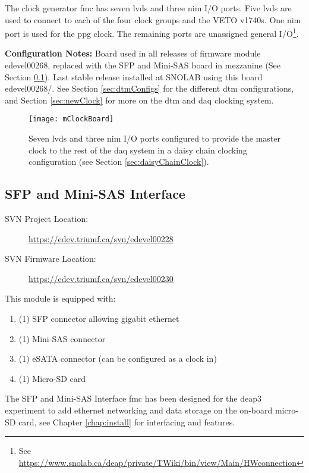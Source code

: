 The clock generator \gls{fmc} has seven \gls{lvds} and three \gls{nim} I/O ports. Five \gls{lvds} are used to connect to each of the four clock groups and the VETO \gls{v1740}s. One \gls{nim} port is used for the \gls{ppg} clock. The remaining ports are unassigned general I/O\footnote{See \url{https://www.snolab.ca/deap/private/TWiki/bin/view/Main/HWconnection}}.

\textbf{Configuration Notes:} Board used in all releases of firmware module edevel00268, replaced with the SFP and Mini-SAS board in mezzanine (See Section \ref{sec:SFPBoard}). Last stable release installed at SNOLAB using this board edevel00268/\tagTwoSixEight. See Section \ref{sec:dtmConfigs} for the different \gls{dtm} configurations, and Section \ref{sec:newClock} for more on the \gls{dtm} and \gls{daq} clocking system.

\begin{figure}
\centering
\texttt{[image: mClockBoard]}
\caption{Seven \gls{lvds} and three \gls{nim} I/O ports configured to provide the master clock to the rest of the \gls{daq} system in a daisy chain clocking configuration (see Section \ref{sec:daisyChainClock}).}
\label{Fig:mClockBoard}
\end{figure}



\subsection{SFP and Mini-SAS Interface}
\label{sec:SFPBoard}
\begin{description}
\item[SVN Project Location: ]\url{https://edev.triumf.ca/svn/edevel00228}
\item[SVN Firmware Location: ]\url{https://edev.triumf.ca/svn/edevel00230}
\end{description}
\noindent This module is equipped with:
	\begin{enumerate}
	\item (1) SFP connector allowing gigabit ethernet
	\item (1) Mini-SAS connector
	\item (1) eSATA connector (can be configured as a clock in)
	\item (1) Micro-SD card
	\end{enumerate}

The SFP and Mini-SAS Interface \gls{fmc} has been designed for the \gls{deap3} experiment to add ethernet networking and data storage on the on-board micro-SD card, see Chapter \ref{chap:install} for interfacing and features.

